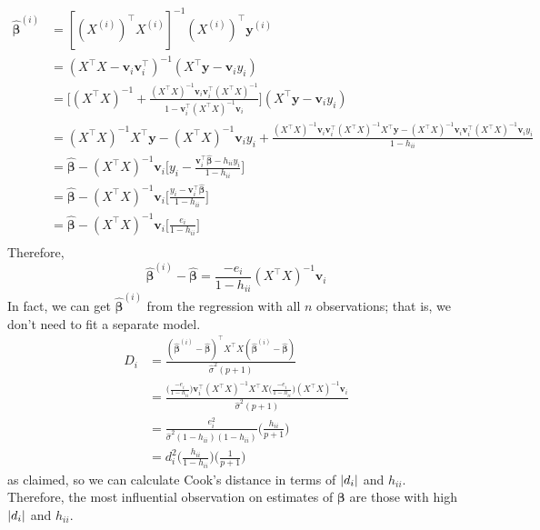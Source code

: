 \begin{align*}
    \hat{\symbf{\beta}}^{(i)}
     & =[(X^{(i)})^\top
    X^{(i)}]^{-1}(X^{(i)})^\top \symbf{y}^{(i)}                                       \\
     & =(X^\top X-\symbf{v}_i\symbf{v}_i^\top)^{-1}(X^\top \symbf{y}-
    \symbf{v}_i y_i)                                                                  \\
     & =\biggl[(X^\top X)^{-1}+\frac{(X^\top X)^{-1}\symbf{v}_i\symbf{v}_i^\top
            (X^\top X)^{-1}}{1-\symbf{v}_i^\top (X^\top X)^{-1}\symbf{v}_i} \biggr]
    (X^\top \symbf{y}-\symbf{v}_i y_i)                                                \\
     & =(X^\top X)^{-1}X^\top\symbf{y}-(X^\top X)^{-1}\symbf{v}_i y_i+
    \frac{(X^\top X)^{-1}\symbf{v}_i\symbf{v}_i^\top (X^\top X)^{-1}X^\top\symbf{y}
    -(X^\top X)^{-1}\symbf{v}_i\symbf{v}_i^\top(X^\top X)^{-1}\symbf{v}_i y_i
    }{1-h_{ii}}                                                                       \\
     & =\hat{\symbf{\beta}}-(X^\top X)^{-1}\symbf{v}_i
    \biggl[y_i-\frac{\symbf{v}_i^\top\hat{\symbf{\beta}}-h_{ii}y_i}{1-h_{ii}} \biggr] \\
     & =\hat{\symbf{\beta}}-(X^\top X)^{-1}\symbf{v}_i
    \biggl[\frac{y_i-\symbf{v}_i^\top \hat{\symbf{\beta}}}{1-h_{ii}} \biggr]          \\
     & =\hat{\symbf{\beta}}-(X^\top X)^{-1}\symbf{v}_i
    \biggl[\frac{e_i}{1-h_{ii}} \biggr]                                               \\
\end{align*}
Therefore,
\[ \hat{\symbf{\beta}}^{(i)}-\hat{\symbf{\beta}}=
    \frac{-e_i}{1-h_{ii}}(X^\top X)^{-1}\symbf{v}_i  \]
In fact, we can get $  \hat{\symbf{\beta}}^{(i)} $
from the regression with all $ n $ observations;
that is, we don't need to fit a separate model.
\begin{align*}
    D_i
     & =\frac{(\hat{\symbf{\beta}}^{(i)}-\hat{\symbf{\beta}})^{\top}
        X^\top X(\hat{\symbf{\beta}}^{(i)}-\hat{\symbf{\beta}})}{
    \hat{\sigma}^2(p+1) }                                            \\
     & =\frac{\biggl(\frac{-e_i}{1-h_{ii}} \biggr)
        \symbf{v}_i^\top (X^\top X)^{-1}X^\top X
        \biggl(\frac{-e_i}{1-h_{ii}} \biggr)(X^\top X)^{-1}\symbf{v}_i}{
        \hat{\sigma}^2(p+1)
    }                                                                \\
     & =\frac{e_i^2}{\hat{\sigma}^2(1-h_{ii})(1-h_{ii})}
    \biggl(\frac{h_{ii}}{p+1} \biggr)                                \\
     & =d_i^2\biggl(\frac{h_{ii}}{1-h_{ii}} \biggr)
    \biggl(\frac{1}{p+1} \biggr)
\end{align*}
as claimed, so we can calculate Cook's distance in terms of
$ \lvert d_i\rvert $ and $ h_{ii} $. Therefore, the most influential
observation on estimates of $ \symbf{\beta} $
are those with high $ \lvert d_i\rvert $ and $ h_{ii} $.

